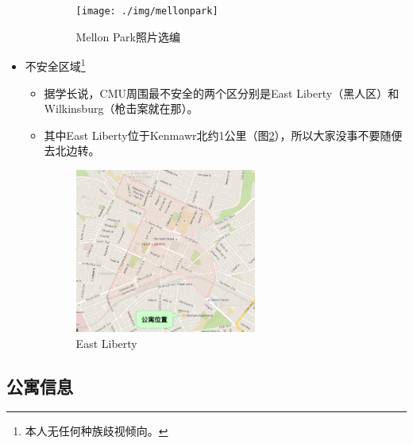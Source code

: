\documentclass[nofonts,a4paper,11pt]{article}
\begin{document}
\begin{itemize}
\begin{itemize}
		\begin{figure}[!htb]
			\centering
			\texttt{[image: ./img/mellonpark]}
			\caption{Mellon Park照片选编}
			\label{fig:mellonpark}
		\end{figure}
	\end{itemize}
	\item 不安全区域\footnote{本人无任何种族歧视倾向。}
	\begin{itemize}
		\item 据学长说，CMU周围最不安全的两个区分别是East Liberty（黑人区）和Wilkinsburg（枪击案就在那）。
		\item 其中East Liberty位于Kenmawr北约1公里（图\ref{fig:eastliberty}），所以大家没事不要随便去北边转。
		\begin{figure}[!htb]
			\centering
			\includegraphics[width=0.6\textwidth]{./img/eastliberty}
			\caption{East Liberty}
			\label{fig:eastliberty}
		\end{figure}
	\end{itemize}
\end{itemize}

\subsection{公寓信息}
\end{document}
